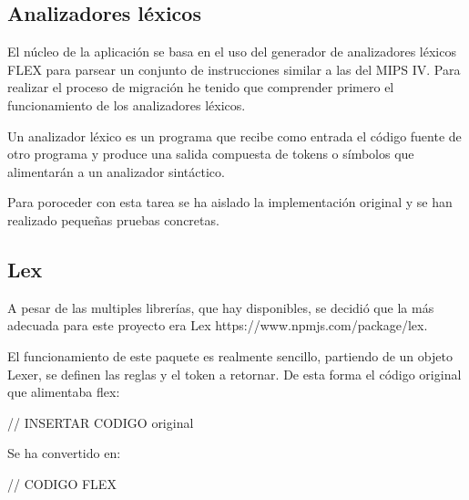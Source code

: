 \subsection{Analizadores léxicos}
El núcleo de la aplicación se basa en el uso del generador de analizadores 
léxicos FLEX para parsear un conjunto de instrucciones similar a las del MIPS IV. 
Para realizar el proceso de migración he tenido que comprender primero el 
funcionamiento de los analizadores léxicos.

\bigskip
Un analizador léxico es un programa que recibe como entrada el código fuente de 
otro programa y produce una salida compuesta de tokens o símbolos 
que alimentarán a un analizador sintáctico.

\bigskip
Para poroceder con esta tarea se ha aislado la implementación original y se han 
realizado pequeñas pruebas concretas.

\subsection{Lex}

A pesar de las multiples librerías, que hay disponibles, se decidió que la más adecuada 
para este proyecto era Lex https://www.npmjs.com/package/lex. 

El funcionamiento de este paquete es realmente sencillo, partiendo de un 
objeto Lexer, se definen las reglas y el token a retornar. De esta forma
el código original que alimentaba flex:

// INSERTAR CODIGO original

Se ha convertido en: 

// CODIGO FLEX